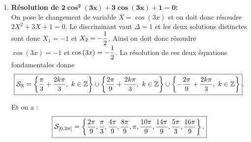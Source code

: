 \documentclass[a4paper, 11pt]{article}
\begin{document}
\begin{correction}
\begin{enumerate}
\begin{minipage}[c]{0.45\textwidth}
\end{minipage}
\quad \begin{minipage}[c]{0.45\textwidth}
\begin{center}
\end{center}
\end{minipage}
\item \textbf{R\'esolution de $\mathbf{ 2\cos^2{(3x)}+3\cos{(3x)}+1=0    }$:}\\
\noindent On pose le changement de variable $X=\cos{(3x)}$ et on doit donc r\'esoudre $2X^2+3X+1=0$. Le discriminant vaut $\Delta=1$ et les deux solutions distinctes sont donc $X_1=-1$ et $X_2=-\displaystyle\frac{1}{2}$. Ainsi on doit donc r\'esoudre $\cos{(3x)}=-1$ et $\cos{(3x)}=-\displaystyle\frac{1}{2}$. La r\'esolution de ces deux \'equations fondamentales donne 
$$ \fbox{$\mathcal{S}_{\R}=\left\lbrace  \ddp\frac{\pi}{3}+\ddp\frac{2k\pi}{3} ,\ k\in\Z\right\rbrace\cup\left\lbrace  \ddp\frac{2\pi}{9}+\ddp\frac{2k\pi}{3},\ k\in\Z\right\rbrace\cup\left\lbrace  -\ddp\frac{2\pi}{9}+\ddp\frac{2k\pi}{3},\ k\in\Z\right\rbrace$}.$$
\begin{minipage}[c]{0.45\textwidth}
Et on a :
$$ \fbox{$\mathcal{S}_{\lbrack 0,2\pi\lbrack}=\left\lbrace \displaystyle\frac{2\pi}{9} , \displaystyle\frac{\pi}{3},\displaystyle\frac{4\pi}{9} ,\displaystyle\frac{8\pi}{9},\pi,\displaystyle\frac{10\pi}{9},\displaystyle\frac{14\pi}{9},\displaystyle\frac{5\pi}{3},\displaystyle\frac{16\pi}{9} \right\rbrace .$}$$
\end{minipage}
\quad \begin{minipage}[c]{0.45\textwidth}

\end{minipage}
\end{enumerate}
\end{correction}
\end{document}

